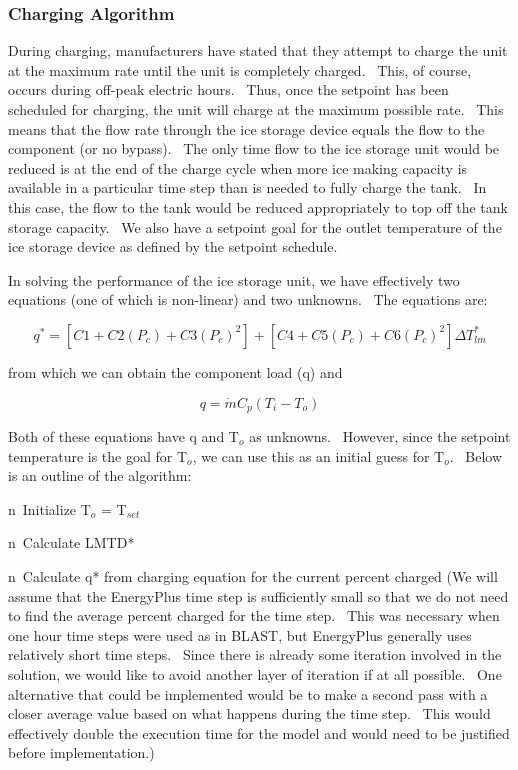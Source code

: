\subsubsection{Charging Algorithm}\label{charging-algorithm}

During charging, manufacturers have stated that they attempt to charge the unit at the maximum rate until the unit is completely charged.~ This, of course, occurs during off-peak electric hours.~ Thus, once the setpoint has been scheduled for charging, the unit will charge at the maximum possible rate.~ This means that the flow rate through the ice storage device equals the flow to the component (or no bypass).~ The only time flow to the ice storage unit would be reduced is at the end of the charge cycle when more ice making capacity is available in a particular time step than is needed to fully charge the tank.~ In this case, the flow to the tank would be reduced appropriately to top off the tank storage capacity. ~We also have a setpoint goal for the outlet temperature of the ice storage device as defined by the setpoint schedule.

In solving the performance of the ice storage unit, we have effectively two equations (one of which is non-linear) and two unknowns.~ The equations are:

\begin{equation}
{q^*} = \left[ {C1 + C2\left( {{P_c}} \right) + C3{{\left( {{P_c}} \right)}^2}} \right] + \left[ {C4 + C5\left( {{P_c}} \right) + C6{{\left( {{P_c}} \right)}^2}} \right]\Delta T_{lm}^*
\end{equation}

from which we can obtain the component load (q) and

\begin{equation}
q = \dot m{C_p}\left( {{T_i} - {T_o}} \right)
\end{equation}

Both of these equations have q and T\(_{o}\) as unknowns.~ However, since the setpoint temperature is the goal for T\(_{o}\), we can use this as an initial guess for T\(_{o}\).~ Below is an outline of the algorithm:

n~Initialize T\(_{o}\) = T\(_{set}\)

n~Calculate LMTD*

n~Calculate q* from charging equation for the current percent charged (We will assume that the EnergyPlus time step is sufficiently small so that we do not need to find the average percent charged for the time step.~ This was necessary when one hour time steps were used as in BLAST, but EnergyPlus generally uses relatively short time steps.~ Since there is already some iteration involved in the solution, we would like to avoid another layer of iteration if at all possible.~ One alternative that could be implemented would be to make a second pass with a closer average value based on what happens during the time step.~ This would effectively double the execution time for the model and would need to be justified before implementation.)

